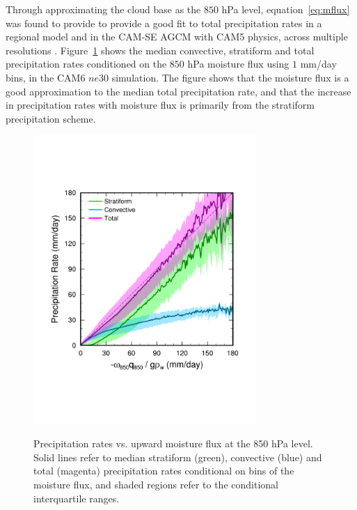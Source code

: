 \documentclass[times]{qjrms4}
\begin{document}
Through approximating the cloud base as the $850$ hPa level, equation~\ref{eq:mflux} was found to provide to provide a good fit to total precipitation rates in a regional model \citep{RETAL2016CD} and in the CAM-SE AGCM with CAM5 physics, across multiple resolutions \citep{OETAL2016JAMES}. Figure~\ref{fig:mflux} shows the median convective, stratiform and total precipitation rates conditioned on the $850$ hPa moisture flux using $1$ mm/day bins, in the CAM6 $ne30$ simulation. The figure shows that the moisture flux is a good approximation to the median total precipitation rate, and that the increase in precipitation rates with moisture flux is primarily from the stratiform precipitation scheme. 

\begin{figure}
\begin{center}
\noindent\includegraphics[width=20pc,angle=0]{figs/temp_mflux.pdf}\\
\end{center}
\caption{Precipitation rates vs. upward moisture flux at the 850 hPa level. Solid lines refer to median stratiform (green), convective (blue) and total (magenta) precipitation rates conditional on bins of the moisture flux, and shaded regions refer to the conditional interquartile ranges.}
\label{fig:mflux}
\end{figure}
\end{document}

